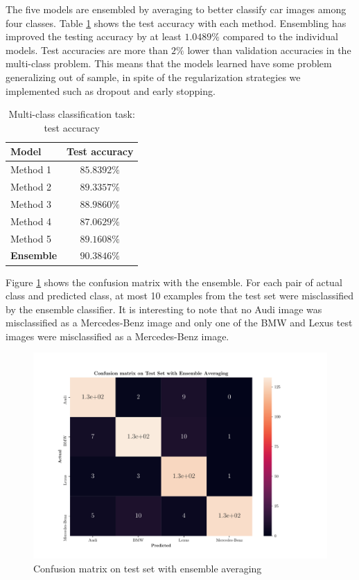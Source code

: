 \documentclass[conference]{IEEEtran}
\begin{document}
The five models are ensembled by averaging to better classify car images among four classes. Table \ref{table:multi:ensemble} shows the test accuracy with each method. Ensembling has improved the testing accuracy by at least $1.0489\%$ compared to the individual models. Test accuracies are more than $2\%$ lower than validation accuracies in the multi-class problem. This means that the models learned have some problem generalizing out of sample, in spite of the regularization strategies we implemented such as dropout and early stopping.

\begin{table}[ht]
	\caption{Multi-class classification task: test accuracy} \label{table:multi:ensemble}
	\centering
\begin{tabular}{| l | c| }
\hline
\textbf{Model} & \textbf{Test accuracy} \\
\hline \hline
Method 1 &  $85.8392\%$ \\ \hline 
Method 2 &  $89.3357\%$ \\ \hline 
Method 3 &  $88.9860\%$ \\ \hline 
Method 4 &  $87.0629\%$ \\ \hline 
Method 5 &  $89.1608\%$ \\ \hline
\textbf{Ensemble} &  $90.3846\%$ \\ 
\hline
\end{tabular}
\end{table}

Figure \ref{fig:confmat} shows the confusion matrix with the ensemble. For each pair of actual class and predicted class, at most 10 examples from the test set were misclassified by the ensemble classifier. It is interesting to note that no Audi image was misclassified as a Mercedes-Benz image and only one of the BMW and Lexus test images were misclassified as a Mercedes-Benz image.

\begin{figure}
    \centering
    \includegraphics[scale=0.32]{main_25_multiclass_00_confusion_matrix.pdf}
    \caption{Confusion matrix on test set with ensemble averaging}
    \label{fig:confmat}
\end{figure}
\end{document}
